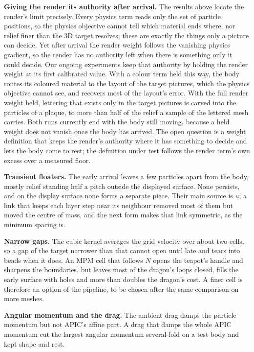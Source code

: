 \textbf{Giving the render its authority after arrival.} The results above locate the render's limit precisely. Every
physics term reads only the set of particle positions, so the physics objective cannot tell which material ends where,
nor relief finer than the 3D target resolves; these are exactly the things only a picture can decide. Yet after arrival
the render weight follows the vanishing physics gradient, so the render has no authority left when there is something
only it could decide. Our ongoing experiments keep that authority by holding the render weight at its first calibrated
value. With a colour term held this way, the body routes its coloured material to the layout of the target pictures, which
the physics objective cannot see, and recovers most of the layout's error. With the full render weight held, lettering that
exists only in the target pictures is carved into the particles of a plaque, to more than half of the relief a sample of the
lettered mesh carries. Both runs currently end with the body still moving, because a held weight does not vanish once the
body has arrived. The open question is a weight definition that keeps the render's authority where it has something to
decide and lets the body come to rest; the definition under test follows the render term's own excess over a measured
floor.

\textbf{Transient floaters.} The early arrival leaves a few particles apart from the body, mostly relief standing half a
pitch outside the displayed surface. None persists, and on the display surface none forms a separate piece. Their main
source is $u$; a link that keeps each layer step near its neighbour removed most of them but moved the centre of mass, and
the next form makes that link symmetric, as the minimum spacing is.

\textbf{Narrow gaps.} The cubic kernel averages the grid velocity over about two cells, so a gap of the target narrower
than that cannot open until late and tears into beads when it does. An MPM cell that follows $N$ opens the teapot's handle
and sharpens the boundaries, but leaves most of the dragon's loops closed, fills the early surface with holes and more
than doubles the dragon's cost. A finer cell is therefore an option of the pipeline, to be chosen after the same comparison
on more meshes.

\textbf{Angular momentum and the drag.} The ambient drag damps the particle momentum but not APIC's affine part. A drag that
damps the whole APIC momentum cut the largest angular momentum several-fold on a test body and kept shape and rest.

